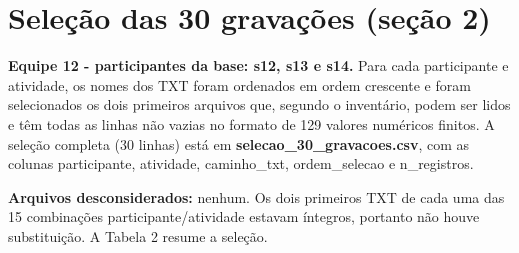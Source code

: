 \section{Seleção das 30 gravações (seção 2)}

\textbf{Equipe 12 - participantes da base: s12, s13 e s14.} Para cada participante e atividade, os nomes dos TXT foram ordenados em ordem crescente e foram selecionados os dois primeiros arquivos que, segundo o inventário, podem ser lidos e têm todas as linhas não vazias no formato de 129 valores numéricos finitos. A seleção completa (30 linhas) está em \textbf{selecao\_30\_gravacoes.csv}, com as colunas participante, atividade, caminho\_txt, ordem\_selecao e n\_registros.

\textbf{Arquivos desconsiderados:} nenhum. Os dois primeiros TXT de cada uma das 15 combinações participante/atividade estavam íntegros, portanto não houve substituição. A Tabela 2 resume a seleção.

